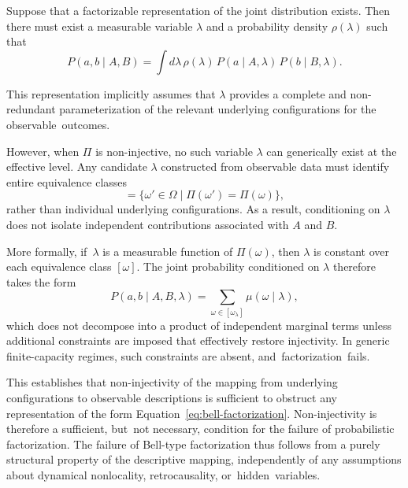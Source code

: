 \documentclass[quantumrep,article,accept,pdftex,oneauthor]{Definitions/mdpi}
\theoremstyle{remark}
\begin{document}
  Suppose that a factorizable representation of the joint distribution exists.
  Then there must exist a measurable variable $\lambda$ and a probability density
  $\rho(\lambda)$ such that
\begin{equation}
    P(a,b \mid A,B)
    =
    \int d\lambda\,
    \rho(\lambda)\,
    P(a \mid A,\lambda)\,
    P(b \mid B,\lambda).
    \label{eq:bell-factorization}
  \end{equation}

  This representation implicitly assumes that $\lambda$ provides a complete and
  non-redundant parameterization of the relevant underlying configurations for the
  observable~outcomes.

  However, when $\Pi$ is non-injective, no such variable $\lambda$ can generically
  exist at the effective level.
  Any candidate $\lambda$ constructed from observable data must identify entire
  equivalence classes
\begin{equation}
    [\omega] = \{\omega' \in \Omega \mid \Pi(\omega')=\Pi(\omega)\},
  \end{equation}
  rather than individual underlying configurations.
  As a result, conditioning on $\lambda$ does not isolate independent contributions
  associated with $A$ and $B$.

  More formally, if~$\lambda$ is a measurable function of $\Pi(\omega)$, then $\lambda$
  is constant over each equivalence class $[\omega]$.
  The joint probability conditioned on $\lambda$ therefore takes the form
\begin{equation}
    P(a,b \mid A,B,\lambda)
    =
    \sum_{\omega \in [\omega_\lambda]} \mu(\omega \mid \lambda),
  \end{equation}
  which does not decompose into a product of independent marginal terms unless
  additional constraints are imposed that effectively restore injectivity.
  In generic finite-capacity regimes, such constraints are absent, and~factorization~fails.

  This establishes that non-injectivity of the mapping from underlying configurations
  to observable descriptions is sufficient to obstruct any representation of the form
  \mbox{Equation~\eqref{eq:bell-factorization}}.
  Non-injectivity is therefore a sufficient, but~not necessary, condition for the
  failure of probabilistic factorization.
  The failure of Bell-type factorization thus follows from a purely structural property
  of the descriptive mapping, independently of any assumptions about dynamical
  nonlocality, retrocausality, or~hidden~variables.
\end{document}
